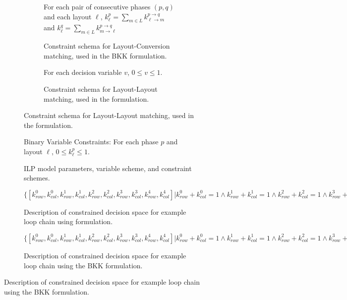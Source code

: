 \begin{figure}
\vspace{20pt}

\begin{subfigure}{\columnwidth} 
\begin{subfigure}{0.45\columnwidth}
For each pair of consecutive phases $(p,q)$ and each layout $\ell$, $k_{\ell}^{p} = \sum_{m \in L}{k_{\ell \rightarrow m}^{p \rightarrow q}}$ and $k_{\ell}^{q} = \sum_{m \in L}{k_{m \rightarrow \ell}^{p \rightarrow q}}$
\caption{Constraint schema for Layout-Conversion matching, used in the BKK formulation.}
\end{subfigure}
\hspace{.1\columnwidth}
\begin{subfigure}{0.45\columnwidth}
For each decision variable $v$, $0 \leq v \leq 1$.
\caption{Constraint schema for Layout-Layout matching, used in the \FormatDecisions{} formulation.}
\end{subfigure}
\end{subfigure}

\begin{subfigure}{\columnwidth}
Binary Variable Constraints: For each phase $p$ and layout $\ell$, $0 \leq k_{\ell}^{p} \leq 1$.
\caption{ILP model parameters, variable scheme, and constraint schemes.}
\end{subfigure}

\begin{subfigure}{\columnwidth}

$\{[k_{row}^{0}, k_{col}^{0}, k_{row}^{1}, k_{col}^{1},k_{row}^{2}, k_{col}^{2},k_{row}^{3}, k_{col}^{3},k_{row}^{4}, k_{col}^{4}] \vert 
k_{row}^0 + k_{col}^0 = 1 \land 
k_{row}^1 + k_{col}^1 = 1 \land 
k_{row}^2 + k_{col}^2 = 1 \land 
k_{row}^3 + k_{col}^3 = 1 \land 
k_{row}^4 + k_{col}^4 = 1 \land 
0 \leq k_{row}^{0} \leq 1 \land
0 \leq k_{col}^{0} \leq 1 \land
0 \leq k_{row}^{1} \leq 1 \land
0 \leq k_{col}^{1} \leq 1 \land
0 \leq k_{row}^{2} \leq 1 \land
0 \leq k_{col}^{2} \leq 1 \land
0 \leq k_{row}^{3} \leq 1 \land
0 \leq k_{col}^{3} \leq 1 \land
0 \leq k_{row}^{4} \leq 1 \land
0 \leq k_{col}^{4} \leq 1 \}
$
\caption{Description of constrained decision space for example loop chain using \FormatDecisions{} formulation.}\label{SelectionExampleConstrainedSpace}
\end{subfigure}

\begin{subfigure}{\columnwidth}

	$\{[k_{row}^{0}, k_{col}^{0}, k_{row}^{1}, k_{col}^{1},k_{row}^{2}, k_{col}^{2},k_{row}^{3}, k_{col}^{3},k_{row}^{4}, k_{col}^{4}] \vert 
	k_{row}^0 + k_{col}^0 = 1 \land 
	k_{row}^1 + k_{col}^1 = 1 \land 
	k_{row}^2 + k_{col}^2 = 1 \land 
	k_{row}^3 + k_{col}^3 = 1 \land 
	k_{row}^4 + k_{col}^4 = 1 \land 
	0 \leq k_{row}^{0} \leq 1 \land
	0 \leq k_{col}^{0} \leq 1 \land
	0 \leq k_{row}^{1} \leq 1 \land
	0 \leq k_{col}^{1} \leq 1 \land
	0 \leq k_{row}^{2} \leq 1 \land
	0 \leq k_{col}^{2} \leq 1 \land
	0 \leq k_{row}^{3} \leq 1 \land
	0 \leq k_{col}^{3} \leq 1 \land
	0 \leq k_{row}^{4} \leq 1 \land
	0 \leq k_{col}^{4} \leq 1 \}
	$
	\caption{Description of constrained decision space for example loop chain using the BKK formulation.}\label{SelectionExampleConstrainedSpace}
	\end{subfigure}


\end{figure}
